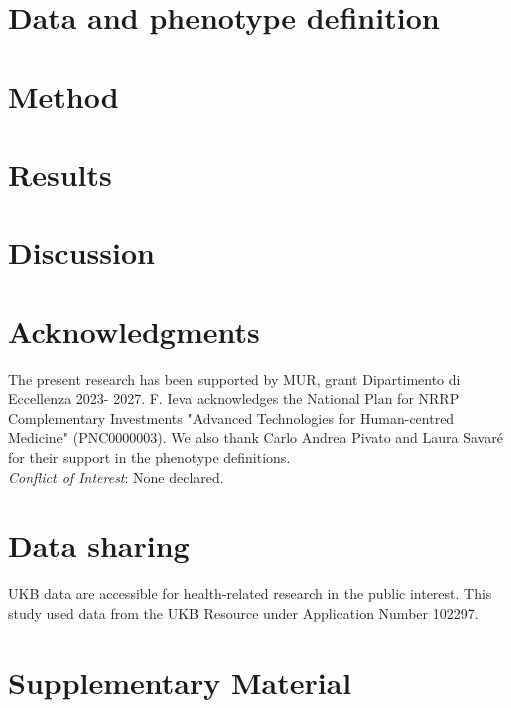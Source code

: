 \documentclass[oupdraft]{bio}
\begin{document}
\section{Data and phenotype definition}\label{sec:data}


\section{Method}\label{sec:method}


\section{Results}\label{sec:results}


\section{Discussion}\label{sec:discussion}








\section*{Acknowledgments}
The present research has been supported by MUR, grant Dipartimento di Eccellenza 2023- 2027.
F. Ieva acknowledges the National Plan for NRRP Complementary Investments "Advanced Technologies for Human-centred Medicine" (PNC0000003). We also thank Carlo Andrea Pivato and Laura Savaré for their support in the phenotype definitions.
\\
{\it Conflict of Interest}: None declared.

\section*{Data sharing}
UKB data are accessible for health-related research in the public interest. This study used data from the UKB Resource under Application Number 102297.


\newpage
\section*{Supplementary Material}




\end{document}

